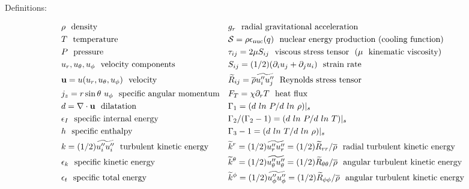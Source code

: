 \documentclass[10pt,paper=a4]{report}
\newcommand{\eht}{\overline}
\newcommand{\fht}{\widetilde}
\begin{document}
\newpage

\begin{table*}
\label{tab:rans-cont}
\caption{Definitions:}
\begin{align}                                                      
& \rho \ \ \mbox{density}                                           & & g_r  \ \ \mbox{radial gravitational acceleration} \nonumber \\
& T \ \ \mbox{temperature}                                          & & {\mathcal S} = \rho \epsilon_\mathrm{nuc} (q) \ \ \mbox{nuclear energy production (cooling function)} \nonumber \\
& P \ \ \mbox{pressure}                                             & & \tau_{ij} = 2\mu S_{ij} \ \ \mbox{viscous stress tensor}  \ \ (\mu \ \ \mbox{kinematic viscosity}) \nonumber \\ 
& u_r, u_\theta, u_\phi \ \ \mbox{velocity components}                 & & S_{ij} = (1/2)(\partial_i u_j + \partial_j u_i) \ \ \mbox{strain rate} \nonumber \\
& {\bf u} = u (u_r, u_\theta, u_\phi) \ \ \mbox{velocity}               & & \fht{R}_{ij} = \eht{\rho}\fht{u''_i u''_j} \ \ \mbox{Reynolds stress tensor} \nonumber \\              
& j_z = r \sin{\theta} \ u_\phi \ \ \mbox{specific angular momentum} & & F_T = \chi \partial_r T \ \ \mbox{heat flux}   \nonumber \\
& d = \nabla \cdot {\bf u} \ \ \mbox{dilatation}                     & & \Gamma_1 = (d \ ln \ P/ d \ ln \ \rho)|_s   \nonumber \\ 
& \epsilon_I \ \ \mbox{specific internal energy}                     & & \Gamma_2 / (\Gamma_2 -1) =  (d \ ln \ P/ d \ ln \ T)|_s \nonumber \\
& h \ \ \mbox{specific enthalpy}                                    & &  \Gamma_3 -1 =  (d \ ln \ T/ d \ ln \ \rho)|_s \nonumber    \\  
& k = (1/2) \fht{u''_iu''_i} \ \ \mbox{turbulent kinetic energy}    & & \fht{k}^r = (1/2) \fht{u''_ru''_r} = (1/2) \fht{R}_{rr}/\eht{\rho} \ \ \mbox{radial turbulent kinetic energy}  \nonumber \\  
& \epsilon_k \ \ \mbox{specific kinetic energy}                      & & \fht{k}^\theta = (1/2)\fht{u''_\theta u''_\theta} = (1/2)\fht{R}_{\theta \theta}/\eht{\rho} \ \ \mbox{angular turbulent kinetic energy}  \nonumber \\
& \epsilon_t \ \ \mbox{specific total energy}                        & & \fht{k}^\phi = (1/2)\fht{u''_\phi u''_\phi} = (1/2) \fht{R}_{\phi \phi}/\eht{\rho} \ \ \mbox{angular turbulent kinetic energy} \nonumber \\ 

\end{align}
\end{table*}
\end{document}
